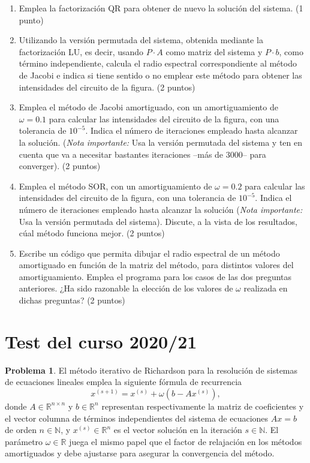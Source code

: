 \begin{enumerate}
\begin{enumerate}
\item Emplea la factorización QR para obtener de nuevo la solución del sistema.  (1 punto)

\item Utilizando la versión permutada del sistema, obtenida mediante la factorización LU, es decir, usando $P\cdot A$ como matriz del sistema y $P\cdot b$, como término independiente, calcula el radio espectral correspondiente al método de Jacobi e indica si tiene sentido o no emplear este método para obtener las intensidades del circuito de la figura. (2 puntos)

\item Emplea el método de Jacobi amortiguado, con un amortiguamiento de $\omega =0.1$ para calcular las intensidades del circuito de la figura, con una tolerancia de $10^{-5}$. Indica el número de iteraciones empleado hasta alcanzar la solución.  (\emph{Nota importante:} Usa la versión permutada del sistema y ten en cuenta que va a necesitar bastantes iteraciones --más de $3000$-- para converger). (2 puntos)

\item Emplea el método SOR, con un amortiguamiento de $\omega =0.2$ para calcular las intensidades del circuito de la figura, con una tolerancia de $10^{-5}$. Indica el número de iteraciones empleado hasta alcanzar la solución (\emph{Nota importante:} Usa la versión permutada del sistema).
Discute, a la vista de los resultados, cúal método funciona mejor. (2 puntos)

\item Escribe un código que permita dibujar el radio espectral de un método amortiguado en función de la matriz del método, para distintos valores del amortiguamiento. Emplea el programa para los casos de las dos preguntas anteriores. ¿Ha sido razonable la elección de los valores de $\omega$ realizada en dichas preguntas? (2 puntos) 
\end{enumerate}
\end{enumerate}

\section{Test del curso 2020/21}
\noindent \textbf{Problema 1}. El método iterativo de Richardson para la resolución de sistemas de ecuaciones lineales emplea la siguiente fórmula de recurrencia
\begin{equation}\label{eq:1}
x^{(s+1)} = x^{(s)} + \omega\left( b - Ax^{(s)}\right),
\end{equation}  
		donde $A \in \mathbb{R}^{n\times n}$ y $b  \in \mathbb{R}^{n}$ representan respectivamente la matriz de coeficientes y el vector columna de términos independientes del sistema de ecuaciones $Ax=b$ de orden $n\in\mathbb{N}$, y $x^{(s)}\in\mathbb{R}^n$ es el vector solución en la iteración $s\in\mathbb{N}$. El parámetro $\omega \in \mathbb{R}$  juega el mismo papel que el factor de relajación en los métodos amortiguados y debe ajustarse para asegurar la convergencia del método.

